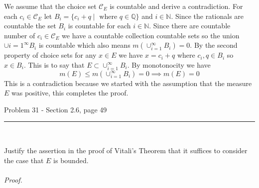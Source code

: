\documentclass[11pt,reqno]{article}
\begin{document}
We assume that the choice set $\mathcal{C}_E$ is countable and derive a contradiction. For each $c_i \in \mathcal{C}_E$ let $B_i = \{ c_i + q \; | \;\text{ where } q \in \mathbb{Q} \}$ and $i \in \mathbb{N}$. Since the rationals are countable the set $B_i$ is countable for each $i \in \mathbb{N}$. Since there are countable number of $c_i \in \mathcal{C}_E$ we have a countable collection countable sets so the union $\cup{i = 1}^\infty B_i$ is countable which also means $m(\cup_{i = 1}^\infty B_i) = 0$. By the second property of choice sets for any $x \in E$ we have $x = c_i + q$ where $c_i, q \in B_i$ so $x \in B_i$. This is to say that $E \subset \cup_{i = 1}^\infty B_i$. By monotonocity we have
\[ m(E) \le m(\cup_{i =1}^\infty B_i) = 0 \implies m(E) = 0 \]
This is a contradiction because we started with the assumption that the measure $E$ was positive, this completes the proof.

\begin{flushleft} 
Problem 31 - Section 2.6, page 49\\
\rule{500pt}{1pt}\\
\end{flushleft} 

Justify the assertion in the proof of Vitali's Theorem that it suffices to consider the case that $E$ is bounded.
\\\\ \emph{Proof.}
\end{document}
